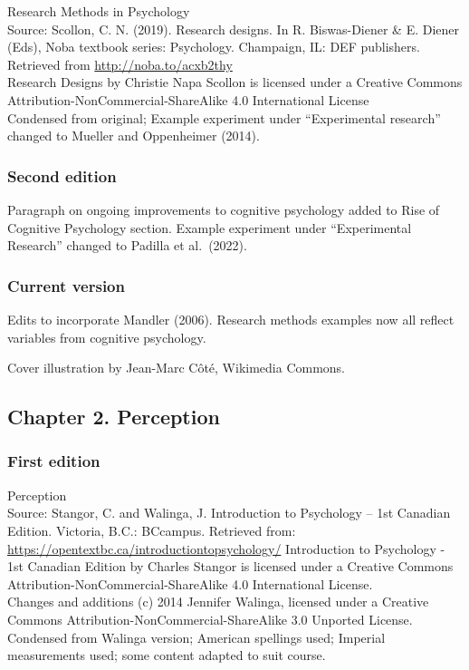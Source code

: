 \documentclass[
]{krantz}
\begin{document}
Research Methods in Psychology\\
Source: Scollon, C. N. (2019). Research designs. In R. Biswas-Diener \& E. Diener (Eds), Noba textbook series: Psychology. Champaign, IL: DEF publishers. Retrieved from \url{http://noba.to/acxb2thy}\\
Research Designs by Christie Napa Scollon is licensed under a Creative Commons Attribution-NonCommercial-ShareAlike 4.0 International License\\
Condensed from original; Example experiment under ``Experimental research'' changed to Mueller and Oppenheimer (2014).

\subsubsection*{Second edition}\label{second-edition-1}


Paragraph on ongoing improvements to cognitive psychology added to Rise of Cognitive Psychology section. Example experiment under ``Experimental Research'' changed to Padilla et al.~(2022).

\subsubsection*{Current version}\label{current-version-1}


Edits to incorporate Mandler (2006). Research methods examples now all reflect variables from cognitive psychology.

Cover illustration by Jean-Marc Côté, Wikimedia Commons.

\subsection*{Chapter 2. Perception}\label{chapter-2.-perception}


\subsubsection*{First edition}\label{first-edition-2}


Perception\\
Source: Stangor, C. and Walinga, J. Introduction to Psychology -- 1st Canadian Edition. Victoria, B.C.: BCcampus. Retrieved from: \url{https://opentextbc.ca/introductiontopsychology/}
Introduction to Psychology - 1st Canadian Edition by Charles Stangor is licensed under a Creative Commons Attribution-NonCommercial-ShareAlike 4.0 International License.\\
Changes and additions (c) 2014 Jennifer Walinga, licensed under a Creative Commons Attribution-NonCommercial-ShareAlike 3.0 Unported License.\\
Condensed from Walinga version; American spellings used; Imperial measurements used; some content adapted to suit course.
\end{document}
